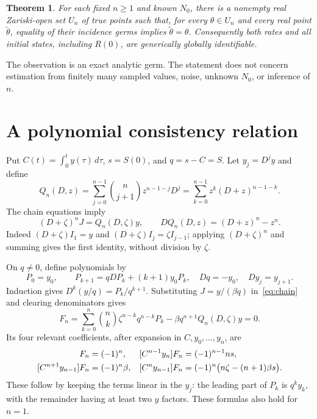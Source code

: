 \documentclass[11pt,a4paper]{article}
\newtheorem{theorem}{Theorem}
\begin{document}
\begin{theorem}\label{thm:main}
For each fixed $n\geq1$ and known $N_0$, there is a nonempty real Zariski-open set $U_n$ of true points such that, for every $\theta\in U_n$ and every real point $\widetilde\theta$, equality of their incidence germs implies $\widetilde\theta=\theta$. Consequently both rates and all initial states, including $R(0)$, are generically globally identifiable.
\end{theorem}
The observation is an exact analytic germ. The statement does not concern estimation from finitely many sampled values, noise, unknown $N_0$, or inference of $n$.

\section{A polynomial consistency relation}
Put $C(t)=\int_0^t y(\tau)\,d\tau$, $s=S(0)$, and $q=s-C=S$.
Let $y_j=D^jy$ and define
\begin{equation}
 Q_n(D,z)=\sum_{j=0}^{n-1}\binom n{j+1}z^{n-1-j}D^j
 =\sum_{k=0}^{n-1}z^k(D+z)^{n-1-k}.
\end{equation}
The chain equations imply
\begin{equation}\label{eq:chain}
 (D+\zeta)^n J=Q_n(D,\zeta)y,\qquad
 DQ_n(D,z)=(D+z)^n-z^n.
\end{equation}
Indeed $(D+\zeta)I_1=y$ and $(D+\zeta)I_j=\zeta I_{j-1}$; applying $(D+\zeta)^n$ and summing gives the first identity, without division by $\zeta$.

On $q\ne0$, define polynomials by
\begin{equation}
 P_0=y_0,\qquad P_{k+1}=qDP_k+(k+1)y_0P_k,
 \quad Dq=-y_0,\quad Dy_j=y_{j+1}.
\end{equation}
Induction gives $D^k(y/q)=P_k/q^{k+1}$. Substituting $J=y/(\beta q)$ in~\eqref{eq:chain} and clearing denominators gives
\begin{equation}\label{eq:F}
 F_n=\sum_{k=0}^n\binom nk\zeta^{n-k}q^{n-k}P_k
       -\beta q^{n+1}Q_n(D,\zeta)y=0.
\end{equation}
Its four relevant coefficients, after expansion in $C,y_0,\ldots,y_n$, are
\begin{align}
 [C^ny_n]F_n&=(-1)^n,&
 [C^{n-1}y_n]F_n&=(-1)^{n-1}ns,\label{eq:coeff}\\
 [C^{n+1}y_{n-1}]F_n&=(-1)^n\beta,&
 [C^ny_{n-1}]F_n&=(-1)^n\bigl(n\zeta-(n+1)\beta s\bigr).\notag
\end{align}
These follow by keeping the terms linear in the $y_j$: the leading part of $P_k$ is $q^k y_k$, with the remainder having at least two $y$ factors. These formulas also hold for $n=1$.
\end{document}
